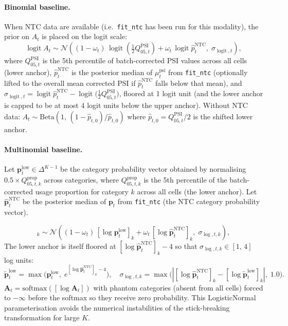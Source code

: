 \documentclass[12pt]{article}
\DeclareMathOperator{\logit}{logit}
\begin{document}
\paragraph{Binomial baseline.}

When NTC data are available (i.e.\ \texttt{fit\_ntc} has been run for this modality),
the prior on $A_t$ is placed on the logit scale:
\begin{equation}
  \logit A_t \sim \mathcal{N}\!\left(
    (1 - \omega_t)\,\logit\!\left(\tfrac12 Q_{05,t}^{\mathrm{PSI}}\right)
    + \omega_t\,\logit \hat p_t^{\mathrm{NTC}},\;
    \sigma_{\logit, t}\right),
\end{equation}
%
where $Q_{05,t}^{\mathrm{PSI}}$ is the 5th percentile of batch-corrected PSI values across
all cells (lower anchor), $\hat p_t^{\mathrm{NTC}}$ is the posterior median of $\mu_t^{\mathrm{psi}}$
from \texttt{fit\_ntc} (optionally lifted to the overall mean corrected PSI if $\hat p_t^{\mathrm{NTC}}$
falls below that mean), and
$\sigma_{\logit, t} = \logit\hat p_t^{\mathrm{NTC}} - \logit\!\bigl(\tfrac12 Q_{05,t}^{\mathrm{PSI}}\bigr)$,
floored at 1 logit unit (and the lower anchor is capped to be at most 4 logit units below
the upper anchor).
Without NTC data:
$A_t \sim \mathrm{Beta}(1,\, (1 - \hat p_{t,0})/\hat p_{t,0})$
where $\hat p_{t,0} = Q_{05,t}^{\mathrm{PSI}}/2$ is the shifted lower anchor.

\paragraph{Multinomial baseline.}

Let $\mathbf{p}_t^{\mathrm{low}} \in \Delta^{K-1}$ be the category probability vector
obtained by normalising $0.5 \times Q_{05,t,k}^{\mathrm{prop}}$ across categories,
where $Q_{05,t,k}^{\mathrm{prop}}$ is the 5th percentile of the batch-corrected usage
proportion for category $k$ across all cells (the lower anchor).
Let $\hat{\mathbf{p}}_t^{\mathrm{NTC}}$ be the posterior median of $\mathbf{p}_t$
from \texttt{fit\_ntc} (the NTC category probability vector).

\begin{equation}
  [\log \mathbf{A}_t]_k \sim \mathcal{N}\!\left(
    (1 - \omega_t)\,[\log \mathbf{p}_t^{\mathrm{low}}]_k
    + \omega_t\,[\log \hat{\mathbf{p}}_t^{\mathrm{NTC}}]_k,\;
    \sigma_{\log,t,k}\right),
\end{equation}
The lower anchor is itself floored at $[\log\hat{\mathbf{p}}_t^{\mathrm{NTC}}]_k - 4$ so that
$\sigma_{\log,t,k} \in [1,\,4]$ log units:
\begin{equation}
  \tilde{\mathbf{p}}_t^{\mathrm{low}} = \max\!\bigl(\mathbf{p}_t^{\mathrm{low}},\;
    e^{[\log\hat{\mathbf{p}}_t^{\mathrm{NTC}}]_k - 4}\bigr),\quad
  \sigma_{\log,t,k} = \max\!\bigl(|[\log\hat{\mathbf{p}}_t^{\mathrm{NTC}}]_k
    - [\log\tilde{\mathbf{p}}_t^{\mathrm{low}}]_k|,\;1.0\bigr).
\end{equation}
$\mathbf{A}_t = \mathrm{softmax}([\log \mathbf{A}_t])$ with phantom
categories (absent from all cells) forced to $-\infty$ before the softmax so they
receive zero probability.
This LogisticNormal parameterisation avoids the numerical instabilities of the
stick-breaking transformation for large $K$.
\end{document}
